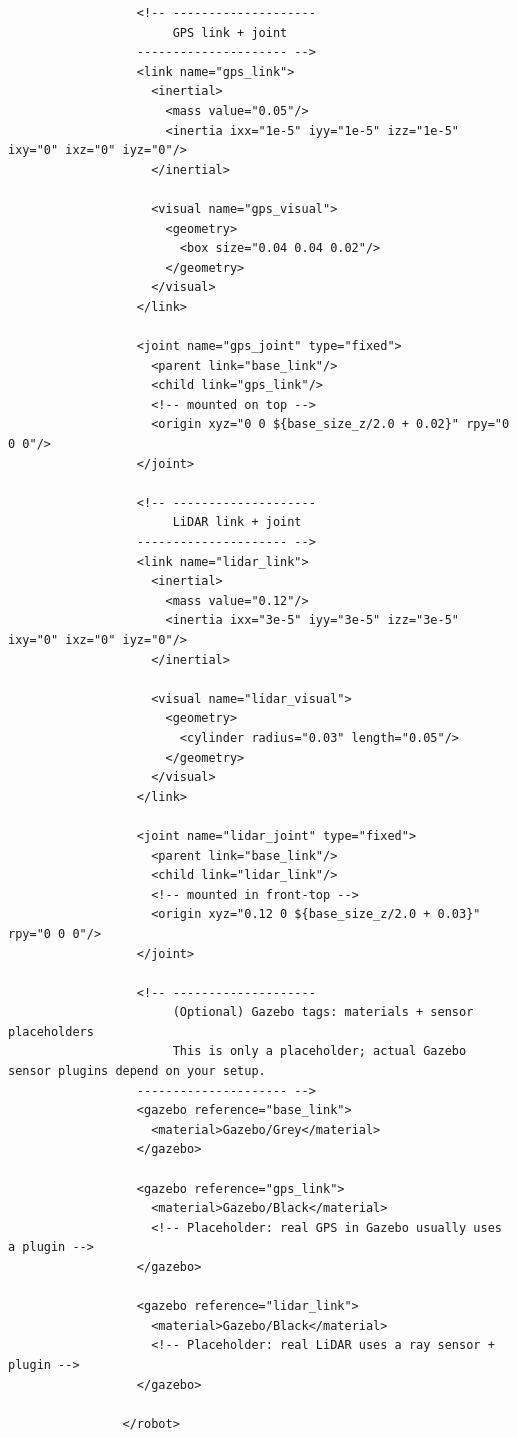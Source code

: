 \documentclass{book}
\begin{document}
\begin{verbatim}
                  <!-- --------------------
                       GPS link + joint
                  --------------------- -->
                  <link name="gps_link">
                    <inertial>
                      <mass value="0.05"/>
                      <inertia ixx="1e-5" iyy="1e-5" izz="1e-5" ixy="0" ixz="0" iyz="0"/>
                    </inertial>
                
                    <visual name="gps_visual">
                      <geometry>
                        <box size="0.04 0.04 0.02"/>
                      </geometry>
                    </visual>
                  </link>
                
                  <joint name="gps_joint" type="fixed">
                    <parent link="base_link"/>
                    <child link="gps_link"/>
                    <!-- mounted on top -->
                    <origin xyz="0 0 ${base_size_z/2.0 + 0.02}" rpy="0 0 0"/>
                  </joint>
                
                  <!-- --------------------
                       LiDAR link + joint
                  --------------------- -->
                  <link name="lidar_link">
                    <inertial>
                      <mass value="0.12"/>
                      <inertia ixx="3e-5" iyy="3e-5" izz="3e-5" ixy="0" ixz="0" iyz="0"/>
                    </inertial>
                
                    <visual name="lidar_visual">
                      <geometry>
                        <cylinder radius="0.03" length="0.05"/>
                      </geometry>
                    </visual>
                  </link>
                
                  <joint name="lidar_joint" type="fixed">
                    <parent link="base_link"/>
                    <child link="lidar_link"/>
                    <!-- mounted in front-top -->
                    <origin xyz="0.12 0 ${base_size_z/2.0 + 0.03}" rpy="0 0 0"/>
                  </joint>
                
                  <!-- --------------------
                       (Optional) Gazebo tags: materials + sensor placeholders
                       This is only a placeholder; actual Gazebo sensor plugins depend on your setup.
                  --------------------- -->
                  <gazebo reference="base_link">
                    <material>Gazebo/Grey</material>
                  </gazebo>
                
                  <gazebo reference="gps_link">
                    <material>Gazebo/Black</material>
                    <!-- Placeholder: real GPS in Gazebo usually uses a plugin -->
                  </gazebo>
                
                  <gazebo reference="lidar_link">
                    <material>Gazebo/Black</material>
                    <!-- Placeholder: real LiDAR uses a ray sensor + plugin -->
                  </gazebo>
                
                </robot>
        \end{verbatim}
\end{document}
